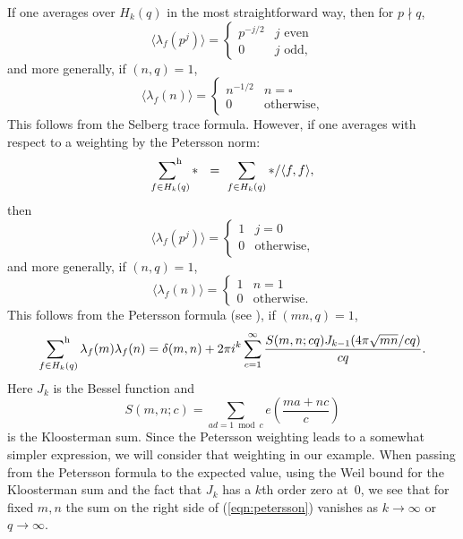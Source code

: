 \documentclass[12pt,letterpaper]{amsart}
\theoremstyle{plain}
\theoremstyle{definition}
\theoremstyle{remark}
\numberwithin{equation}{subsection}
\numberwithin{theorem}{subsection}
\numberwithin{table}{subsection}
\renewcommand{\mod}{\bmod}
\def\sumhar{\operatornamewithlimits{\sum\nolimits^h}}
\begin{document}
If one averages over $H_k(q)$ in the most straightforward way,
then for $p\nmid q$,
\begin{equation}
\langle \lambda_f(p^j) \rangle = 
\begin{cases}
p^{-j/2} & j \text{ \ even} \\
0        & j \text{ \ odd},
\end{cases}
\end{equation}
and more generally, if $(n,q)=1$,
\begin{equation}
\langle \lambda_f(n) \rangle = 
\begin{cases}
n^{-1/2} & n=\square \\
0        & \text{otherwise},
\end{cases}
\end{equation}
This follows from the Selberg trace formula.
However, if one averages with respect to a weighting by the
Petersson norm:
\begin{equation}
\sumhar_{f\in H_k(q)} * \ \ =\ \sum_{f\in H_k(q)} */\langle
f,f\rangle ,
\end{equation}
then
\begin{equation}
\langle \lambda_f(p^j) \rangle = 
\begin{cases}
1 & j =0 \\
0        & \text{otherwise},
\end{cases}
\end{equation}
and more generally, if $(n,q)=1$,
\begin{equation}
\langle \lambda_f(n) \rangle = 
\begin{cases}
1 & n =1 \\
0        & \text{otherwise}.
\end{cases}
\end{equation}
This follows from the Petersson formula (see \cite{Iw1}), if $(mn,q)=1$,
\begin{equation}\label{eqn:petersson}
\sumhar_{f\in H_k(q)} \lambda_f(m)\lambda_f(n)=
\delta(m,n)+2\pi i^k  \sum_{c=1}^\infty \frac{S(m,n;cq)J_{k-1}(4\pi\sqrt{mn}/cq)}{cq}  .
\end{equation}
Here $J_k$ is the Bessel function
and
\begin{equation}
S(m,n;c)=\sum_{ad=1\mod c}e\left(\frac {ma+nc}{c}\right)
\end{equation}
is the Kloosterman sum.  Since the Petersson weighting leads to a somewhat
simpler expression, we will consider that weighting in our example.
When passing from the Petersson formula 
to the expected value, using the Weil bound for the Kloosterman sum
and the fact that $J_k$ has a $k$th order zero at~$0$,
we see that for fixed $m, n$ the sum on
the right side of (\ref{eqn:petersson})
vanishes as $k\to\infty$ or~$q\to\infty$.
\end{document}
